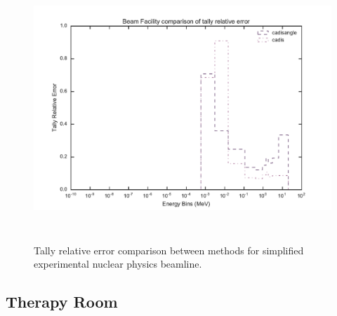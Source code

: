 \begin{figure}[h!]
  \centering
  \includegraphics[height=10cm]{./chapters/characterization_probs/figures/char/beam/beam_facility_tally_error_compare.pdf}
  \caption[Tally relative error comparison between methods
    for simplified experimental nuclear physics beamline.]
  {Tally relative error comparison between methods for simplified experimental
    nuclear physics beamline.}
  \label{fig:beamerror}
\end{figure}
%
%
%

\subsection{Therapy Room}
%   


